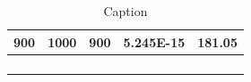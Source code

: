 \documentclass[a4paper, 12pt]{article}
\makeatletter
\renewcommand\section{\clearpage\newpage\@startsection {section}{1}{\z@}%
	{-3.5ex \@plus -1ex \@minus -.2ex}%
	{2.3ex \@plus.2ex}%
	{\normalfont\Large\bfseries}}
\makeatother
\begin{document}
\begin{appendices}
\begin{table}[h!]
{\begin{tabular}{lllll}
		900                       & 1000                      & 900                & 5.245E-15                                 & 181.05            \\ \hline
		&                           &                    &                                           &                   \\
		&                           &                    &                                           &                   \\
		&                           &                    &                                           &                   \\
		&                           &                    &                                           &                  
	\end{tabular}
	}
\caption{Caption}
\label{atm}
\end{table}

%
%
%
%
%
%
%
%
%
%
%	
	
\end{appendices}
\end{document}
